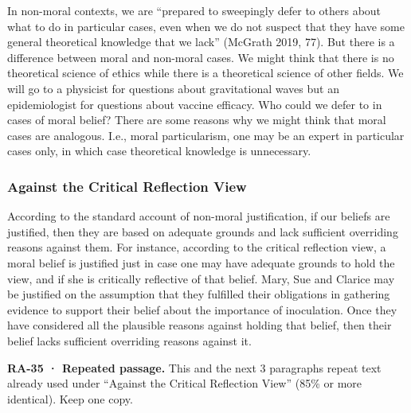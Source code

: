 \documentclass[
  letterpaper,
  DIV=11,
  numbers=noendperiod]{scrartcl}
\theoremstyle{remark}
\begin{document}
In non-moral contexts, we are ``prepared to sweepingly defer to others
about what to do in particular cases, even when we do not suspect that
they have some general theoretical knowledge that we lack'' (McGrath
2019, 77). But there is a difference between moral and non-moral cases.
We might think that there is no theoretical science of ethics while
there is a theoretical science of other fields. We will go to a
physicist for questions about gravitational waves but an epidemiologist
for questions about vaccine efficacy. Who could we defer to in cases of
moral belief? There are some reasons why we might think that moral cases
are analogous. I.e., moral particularism, one may be an expert in
particular cases only, in which case theoretical knowledge is
unnecessary.

\subsubsection{Against the Critical Reflection
View}\label{against-the-critical-reflection-view-1}

According to the standard account of non-moral justification, if our
beliefs are justified, then they are based on adequate grounds and lack
sufficient overriding reasons against them. For instance, according to
the critical reflection view, a moral belief is justified just in case
one may have adequate grounds to hold the view, and if she is critically
reflective of that belief. Mary, Sue and Clarice may be justified on the
assumption that they fulfilled their obligations in gathering evidence
to support their belief about the importance of inoculation. Once they
have considered all the plausible reasons against holding that belief,
then their belief lacks sufficient overriding reasons against it.

\begin{tcolorbox}[enhanced jigsaw, arc=.35mm, bottomrule=.15mm, bottomtitle=1mm, breakable, colback=white, colbacktitle=quarto-callout-important-color!10!white, colframe=quarto-callout-important-color-frame, coltitle=black, left=2mm, leftrule=.75mm, opacityback=0, opacitybacktitle=0.6, rightrule=.15mm, title=\textcolor{quarto-callout-important-color}{\faExclamation}\hspace{0.5em}{Important}, titlerule=0mm, toprule=.15mm, toptitle=1mm]

\textbf{RA-35 · Repeated passage.} This and the next 3 paragraphs repeat
text already used under ``Against the Critical Reflection View'' (85\%
or more identical). Keep one copy.

\end{tcolorbox}
\end{document}
